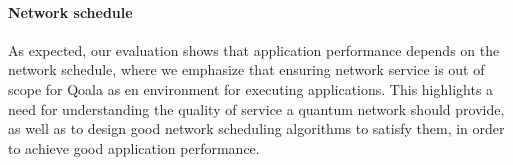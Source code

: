 \paragraph{Network schedule}
As expected, our evaluation shows that application performance depends on the network schedule, where we emphasize that ensuring network service is out of scope for Qoala as en environment for executing applications.
This highlights a need for understanding the quality of service a quantum network should provide, as well as to design good network scheduling algorithms to satisfy them, in order to achieve good application performance.



\begin{xstretch}
\printbibliography[heading=subbibintoc,title={References},notcategory=noprint]
\end{xstretch}
